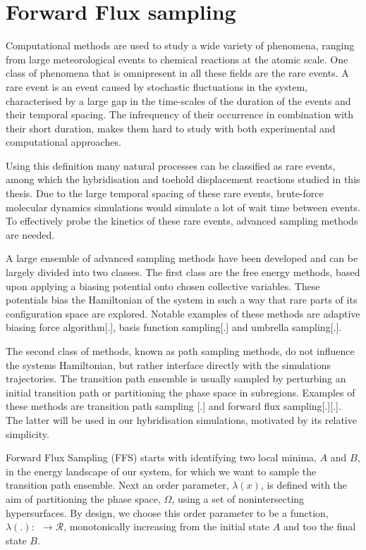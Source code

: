 \section{Forward Flux sampling}

Computational methods are used to study a wide variety of phenomena, ranging from
large meteorological events to chemical reactions at the atomic scale. One class of
phenomena that is omnipresent in all these fields are the rare events. A rare event is an
event caused by stochastic fluctuations in the system, characterised by a large
gap in the time-scales of the duration of the events and their temporal spacing.
The infrequency of their occurrence in combination with their short duration, makes them
hard to study with both experimental and computational approaches.


Using this definition many natural processes can be classified as rare events, among
which the hybridisation and toehold displacement reactions studied in this thesis. Due to
the large temporal spacing of these rare events, brute-force molecular dynamics
simulations would simulate a lot of wait time between events. To effectively probe the
kinetics of these rare events, advanced sampling methods are needed.


A large ensemble of advanced sampling methods have been developed and can be largely
divided into two classes. The first class are the free energy methods, based upon
applying a biasing potential onto chosen collective variables. These potentials bias the
Hamiltonian of the system in such a way that rare parts of its configuration space are
explored. Notable examples of these methods are adaptive biasing force algorithm[.],
basis function sampling[.] and umbrella sampling[.]. %


The second class of methods, known as path sampling methods, do not influence the
systems Hamiltonian, but rather interface directly with the simulations trajectories. The
transition path ensemble is usually sampled by perturbing an initial transition path or
partitioning the phase space in subregions. Examples of these methods are transition
path sampling [.] and forward flux sampling[.][.].  The latter will be used in our
hybridisation simulations, motivated by its relative simplicity.


Forward Flux Sampling (FFS) starts with identifying two local minima, $A$ and $B$, in the
energy landscape of our system, for which we want to sample the transition path ensemble.
Next an order parameter, $\lambda(x)$, is defined with the aim of partitioning the
phase space, $\Omega$, using a set of nonintersecting hypersurfaces. By design, we
choose this order parameter to be a function, $\lambda(.):\ $\Omega$\ \rightarrow
\mathcal{R}$, monotonically increasing from the initial state $A$ and too the final
state $B$.


